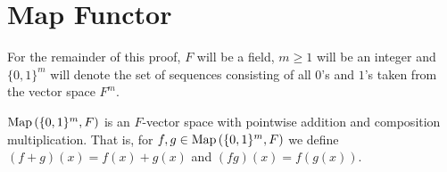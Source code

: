 \section{Map Functor}
For the remainder of this proof, \(F\) will be a field, \(m \ge 1\) will be an integer and \(\{0, 1\} ^{m}\) will denote the set of sequences consisting of all \(0\)'s and \(1\)'s taken from the vector space \(F^{m}\).
\begin{proposition}
	\(\operatorname{Map}\left( \{0, 1\} ^{m}, F \right) \) is an \(F\)-vector space with pointwise addition and composition multiplication. That is, for \(f, g \in \operatorname{Map} \left( \{0, 1\} ^{m}, F \right) \) we define \(\left( f + g \right) \left( x \right)  = f\left( x \right)  + g\left( x \right) \) and \(\left( fg \right) \left( x \right)  = f\left( g\left( x \right)  \right) \).
\end{proposition}
